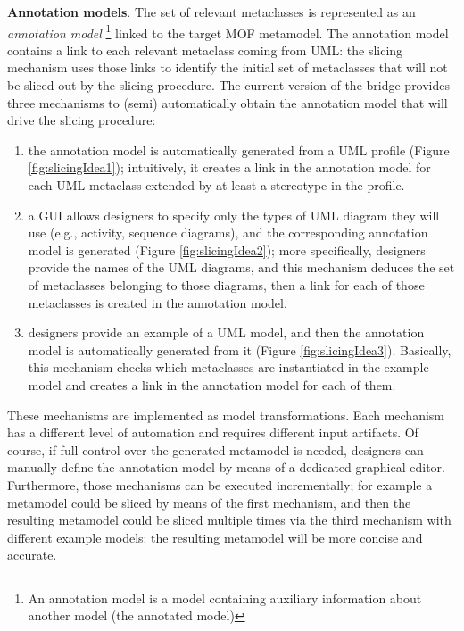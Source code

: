 \textbf{Annotation models}. 
The set of relevant metaclasses is represented as an \textit{annotation model}
\footnote{An annotation model is a model containing auxiliary information about another model (the annotated model)\cite{MCDFthesis}} linked to the target MOF metamodel.
The annotation model contains a link to each relevant metaclass coming from UML: the slicing mechanism uses those links to identify the initial set of metaclasses that will not be sliced out by the slicing procedure.
The current version of the bridge provides three mechanisms to (semi) automatically obtain the annotation model that will drive the slicing procedure:
%
\begin{enumerate}
	\item the annotation model is automatically generated from a UML profile (Figure \ref{fig:slicingIdea1}); intuitively, it creates a link in the annotation model
	for each UML metaclass extended by at least a stereotype in the profile.
	\item a GUI allows designers to specify only the types of UML diagram they will use (e.g., activity, sequence diagrams), and the corresponding annotation model
	is generated (Figure \ref{fig:slicingIdea2}); more specifically, designers provide the names of the UML diagrams, and this mechanism deduces the set of metaclasses belonging to those diagrams, 
	then a link for each of those metaclasses is created in the annotation model.
	\item designers provide an example of a UML model, and then the annotation model is automatically generated from it (Figure \ref{fig:slicingIdea3}).
	Basically, this mechanism checks which metaclasses are instantiated in the example model and creates a link in the annotation model for each of them.
\end{enumerate}
%
\vspace{-.2cm}
These mechanisms are implemented as model transformations. Each mechanism has a different level of automation and requires different input artifacts. 
Of course, if full control over the generated metamodel is needed, designers can manually define the annotation model by means of a dedicated graphical editor.
Furthermore, those mechanisms can be executed incrementally; 
for example a metamodel could be sliced by means of the first
mechanism, and then the resulting metamodel could be sliced multiple times via the third mechanism with different example models: the resulting metamodel will be more concise and accurate.
%

